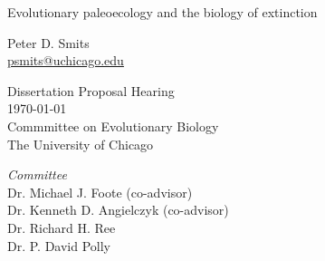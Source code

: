 \documentclass[12pt,letterpaper]{article}
\begin{document}
\setcounter{secnumdepth}{0}

\begin{titlepage}
  \begin{center}
    \huge{Evolutionary paleoecology and the biology of extinction}

    \vspace{1.5cm}

    \large{Peter D. Smits \\}
    \footnotesize{\href{mailto:psmits@uchicago.edu}{psmits@uchicago.edu}}

    \vspace{1.5cm}

    Dissertation Proposal Hearing \\
    \today \\
    Commmittee on Evolutionary Biology \\
    The University of Chicago

    \vspace{1.5cm}

    \textit{Committee} \\
    Dr. Michael J. Foote (co-advisor) \\
    Dr. Kenneth D. Angielczyk (co-advisor) \\
    Dr. Richard H. Ree \\
    Dr. P. David Polly
  \end{center}
\end{titlepage}

\linenumbers
\modulolinenumbers[2]
\end{document}
